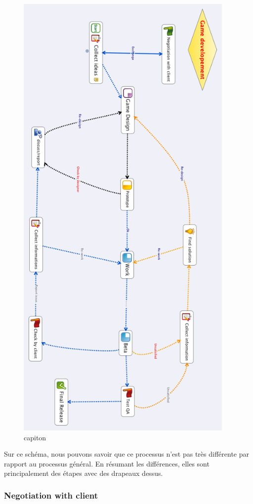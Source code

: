 \begin{figure}[htbp]
	\centering
		\includegraphics[height=9in]{XMinds/GamedevelopementChugulu.png}
	\caption{capiton}
	\label{fig:XMinds_GamedevelopementChugulu}
\end{figure}


Sur ce schéma, nous pouvons savoir que ce processus n'est pas très différente par rapport au processus général. En résumant les différences, elles sont principalement des étapes avec des drapeaux dessus. 

\subsubsection{Negotiation with client } %
\label{ssub:negotiation_with_client_}

